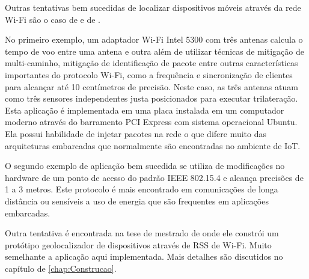 Outras tentativas bem sucedidas de localizar dispositivos móveis através da rede
Wi-Fi são o caso de  e de .

No primeiro exemplo, um adaptador Wi-Fi Intel 5300 com três antenas calcula o tempo
de voo entre uma antena e outra além de utilizar técnicas de mitigação de
multi-caminho, mitigação de identificação de pacote entre outras características
importantes do protocolo Wi-Fi, como a frequência e sincronização de clientes
para alcançar até 10 centímetros de precisão. Neste caso, as três antenas atuam
como três sensores independentes justa posicionados para executar trilateração.
Esta aplicação é implementada em uma placa instalada em um computador moderno
através do barramento PCI Express com sistema operacional Ubuntu. Ela possui habilidade
de injetar pacotes na rede o que difere muito das arquiteturas embarcadas que
normalmente são encontradas no ambiente de IoT.

O segundo exemplo de aplicação bem sucedida se utiliza de modificações no
hardware de um ponto de acesso do padrão IEEE 802.15.4 e alcança precisões de 1 a 3
metros. Este protocolo é mais encontrado em comunicações de longa distância ou
sensíveis a uso de energia que são frequentes em aplicações embarcadas.

Outra tentativa é encontrada na tese de mestrado de  onde ele constrói
um protótipo geolocalizador de dispositivos através de RSS de Wi-Fi. Muito semelhante a aplicação
aqui implementada. Mais detalhes são discutidos no capítulo de \autoref{chap:Construcao}.
